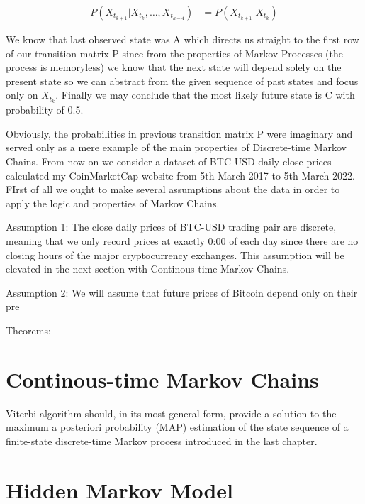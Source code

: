 \begin{align}
P(X_{t_{k+1}}|X_{t_{k}},\ldots,X_{t_{k-4}}) &= P(X_{t_{k+1}}|X_{t_{k}})
\end{align}

We know that last observed state was A which directs us straight to the first row of our transition matrix P since from the properties of Markov Processes (the process is memoryless) we know that the next state will depend solely on the present state so we can abstract from the given sequence of past states and focus only on $X_{t_{k}}$. Finally we may conclude that the most likely future state is C with probability of 0.5. 

Obviously, the probabilities in previous transition matrix P were imaginary and served only as a mere example of the main properties of Discrete-time Markov Chains. From now on we consider a dataset of BTC-USD daily close prices calculated my CoinMarketCap website from 5th March 2017 to 5th March 2022. FIrst of all we ought to make several assumptions about the data in order to apply the logic and properties of Markov Chains. 

Assumption 1: The close daily prices of BTC-USD trading pair are discrete, meaning that we only record prices at exactly 0:00 of each day since there are no closing hours of the major cryptocurrency exchanges. This assumption will be elevated in the next section with Continous-time Markov Chains.

Assumption 2: We will assume that future prices of Bitcoin depend only on their pre





Theorems:





\section{Continous-time Markov Chains}  %
\label{section1.3}





Viterbi algorithm should, in its most general form, provide a solution to the maximum a posteriori probability (MAP) estimation of the state sequence of a finite-state discrete-time Markov process introduced in the last chapter. 


\section{Hidden Markov Model}

